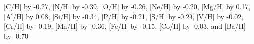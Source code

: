 [C/H] by -0.27, [N/H] by -0.39, [O/H] by -0.26, [Ne/H] by -0.20, [Mg/H] by 0.17, [Al/H] by 0.08, [Si/H] by -0.34, [P/H] by -0.21, [S/H] by -0.29, [V/H] by -0.02, [Cr/H] by -0.19, [Mn/H] by -0.36, [Fe/H] by -0.15, [Co/H] by -0.03,  and [Ba/H] by -0.70%

